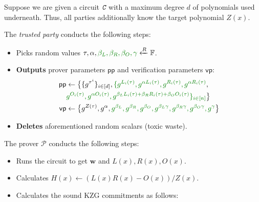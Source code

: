 \documentclass[../lecture-notes-148x210.tex]{subfiles}
\begin{document}
\begin{tcolorbox}[title=Attempt \#3: Sound SNARK Protocol,
    breakable,
    colback=blue!5!white,
    colframe=blue!75!black,
    colbacktitle=blue!25!white,
    coltitle=blue!20!black,
    fonttitle=\bfseries,
    boxrule=1.25pt,
    subtitle style={boxrule=0pt,
    colback=blue!20!white,
    colupper=blue!75!gray} ]

    Suppose we are given a circuit $\textit{\texttt{C}}$ with a maximum degree $d$ of polynomials used underneath. Thus, all parties additionally know the target polynomial $Z(x)$.

    The \emph{trusted party} conducts the following steps:
    \begin{itemize}[label=]
        \item Picks random values $\tau, \alpha, \textcolor{green!50!black}{\beta_L, \beta_R, \beta_O, \gamma} \xleftarrow{R} \mathbb{F}$.
        \item \textbf{Outputs} prover parameters $\mathsf{pp}$ and verification parameters $\mathsf{vp}$:
        \begin{align*}
            \mathsf{pp} &\gets \big\{\{g^{\tau^i}\}_{i \in [d]}, \textcolor{green!50!black}{\{g^{L_i(\tau)}, g^{\alpha L_i(\tau)}, g^{R_i(\tau)}, g^{\alpha R_i(\tau)}}, \\ 
            & \textcolor{green!50!black}{g^{O_i(\tau)}, g^{\alpha O_i(\tau)}, g^{\beta_LL_i(\tau)+\beta_RR_i(\tau)+\beta_OO_i(\tau)}\}_{i \in [n]}}\big\} \\
            \mathsf{vp} &\gets \big\{ g^{Z(\tau)}, g^{\alpha}, \textcolor{green!50!black}{g^{\beta_L}, g^{\beta_R}, g^{\beta_O}, g^{\beta_L\gamma}, g^{\beta_R\gamma}, g^{\beta_O\gamma}, g^{\gamma}} \big\}
        \end{align*}
        \item \textbf{Deletes} aforementioned random scalars (toxic waste).
    \end{itemize}
    The prover $\mathcal{P}$ conducts the following steps:
    \begin{itemize}[label=]
        \item Runs the circuit to get $\mathbf{w}$ and $L(x),R(x),O(x)$.
        \item Calculates $H(x) \gets (L(x)R(x) - O(x))\big/ Z(x)$.
        \item Calculates the sound KZG commitments as follows: 
        \begin{align*}

\end{align*}
\end{itemize}
\end{tcolorbox}
\end{document}
